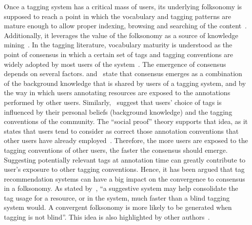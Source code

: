Once a tagging system has a critical mass of users, its underlying folksonomy is supposed to reach a point in which the vocabulary and tagging patterns are mature enough to allow proper indexing, browsing and searching of the content~\citep[see Sec.~\ref{sec:intro_tagging_systems_and_folksonomies} and][]{Guy2006,Spiteri2006}. Additionally, it leverages the value of the folksonomy as a source of knowledge mining~\citep{Wagner2014}.
In the tagging literature, vocabulary maturity is understood as the point of consensus in which a certain set of tags and tagging conventions are widely adopted by most users of the system~\citep{halpin2006,Sen,Cattuto2006,Sood2007,Robu2009,Wagner2014}. 
The emergence of consensus depends on several factors. 
\cite{halpin2006} and~\cite{Robu2009} state that consensus emerges as a combination of the background knowledge that is shared by users of a tagging system, and by the way in which users annotating resources are exposed to the annotations performed by other users. 
Similarly,~\cite{Sen} suggest that users' choice of tags is influenced by their personal beliefs (background knowledge) and the tagging conventions of the community. The ``social proof'' theory supports that idea, as it states that users tend to consider as correct those annotation conventions that other users have already employed~\citep{Cialdini2001}.
Therefore, the more users are exposed to the tagging conventions of other users, the faster the consensus should emerge. 
Suggesting potentially relevant tags at annotation time can greatly contribute to user's exposure to other tagging conventions. Hence, it has been argued that tag recommendation systems can have a big impact on the convergence to consensus in a folksonomy. As stated by~\cite{marlow2006}, ``a suggestive system may help consolidate the tag usage for a resource, or in the system, much faster than a blind tagging system would. A convergent folksonomy is more likely to be generated when tagging is not blind''. %
This idea is also highlighted by other authors~\citep{golder2006,jaske2007,Sood2007,farooq2007,Robu2009,Wagner2014}.


